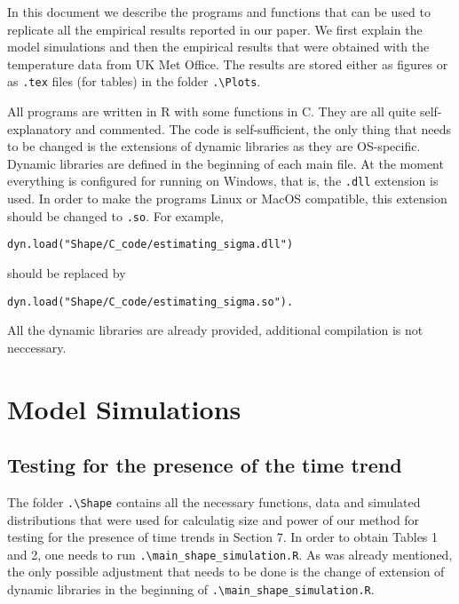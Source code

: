 \documentclass[a4paper,12pt]{article}
\begin{document}


\version{\today}

In this document we describe the programs and functions that can be used to replicate all the empirical results reported in our paper. We first explain the model simulations and then the empirical results that were obtained with the temperature data from UK Met Office. The results are stored either as figures or as \verb|.tex| files (for tables) in the folder \verb|.\Plots|.

All programs are written in R with some functions in C. They are all quite self-explanatory and commented. The code is self-sufficient, the only thing that needs to be changed is the extensions of dynamic libraries as they are OS-specific. Dynamic libraries are defined in the beginning of each main file. At the moment everything is configured for running on Windows, that is, the \verb|.dll| extension is used. In order to make the programs Linux or MacOS compatible, this extension should be changed to \verb|.so|. For example, 
\begin{verbatim}
dyn.load("Shape/C_code/estimating_sigma.dll")
\end{verbatim} should be replaced by
\begin{verbatim}
dyn.load("Shape/C_code/estimating_sigma.so").
\end{verbatim}

All the dynamic libraries are already provided, additional  compilation is not neccessary.

\section{Model Simulations}
\subsection{Testing for the presence of the time trend}
The folder \verb|.\Shape| contains all the necessary functions, data and simulated distributions that were used for calculatig size and power of our method for testing for the presence of time trends in Section 7. In order to obtain Tables 1 and 2, one needs to run \verb|.\main_shape_simulation.R|. As was already mentioned, the only possible adjustment that needs to be done is the change of extension of dynamic libraries in the beginning of \verb|.\main_shape_simulation.R|. 
\end{document}
